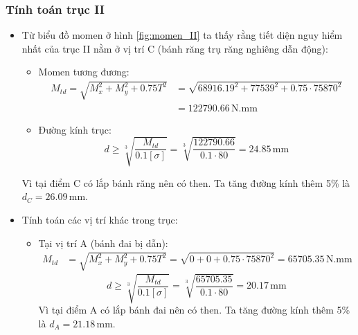             \subsubsection{Tính toán trục II}
                \begin{itemize}
                    \item Từ biểu đồ momen ở hình \ref{fig:momen_II} ta thấy rằng tiết diện nguy hiểm nhất của trục II nằm ở vị trí C (bánh răng trụ răng nghiêng dẫn động):
                        \begin{itemize}
                            \item Momen tương đương:
                                \begin{align*}
                                    M_{td} = \sqrt{M_{x}^2 + M_{y}^2 +  0.75T^2} &= \sqrt{68916.19^2 + 77539^2 + 0.75 \cdot 75870^2}\\ 
                                                                                 &= 122790.66 \, \mathrm{N.mm}
                                \end{align*}
                            \item Đường kính trục:
                                \[
                                    d \geq \sqrt[3]{\frac{M_{td}}{0.1 [\sigma]}} = \sqrt[3]{\frac{122790.66}{0.1 \cdot 80}} = 24.85 \, \mathrm{mm}
                                \]
                        \end{itemize}
                        \hspace*{0.6cm}Vì tại điểm C có lắp bánh răng nên có then. Ta tăng đường kính thêm 5\% là $d_C = 26.09 \, \mathrm{mm}$.
                    \item Tính toán các vị trí khác trong trục:
                        \begin{itemize}
                            \item Tại vị trí A (bánh đai bị dẫn):
                                \begin{align*}
                                    M_{td} &= \sqrt{M_{x}^2 + M_{y}^2 +  0.75T^2} = \sqrt{0 + 0 + 0.75 \cdot 75870^2} = 65705.35 \, \mathrm{N.mm}
                                \end{align*}
                                \[
                                    d \geq \sqrt[3]{\frac{M_{td}}{0.1 [\sigma]}} = \sqrt[3]{\frac{65705.35}{0.1 \cdot 80}} = 20.17 \, \mathrm{mm}
                                \]
                                Vì tại điểm A có lắp bánh đai nên có then. Ta tăng đường kính thêm 5\% là $d_A = 21.18 \, \mathrm{mm}$.

\end{itemize}
\end{itemize}
